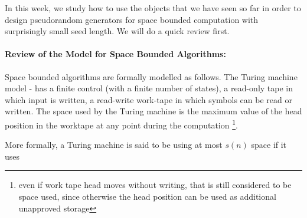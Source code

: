 
In this week, we study how to use the objects that we have seen so far in order to design pseudorandom generators for space bounded computation with surprisingly small seed length. We will do a quick review first.

\paragraph{Review of the Model for Space Bounded Algorithms:} Space bounded algorithms are formally modelled as follows. The Turing machine model - has a finite control (with a finite number of states), a read-only tape in which input is written, a read-write work-tape in which symbols can be read or written. The space used by the Turing machine is the maximum value of the head position in the worktape at any point during the computation \footnote{even if work tape head moves without writing, that is still considered to be space used, since otherwise the head position can be used as additional unapproved storage}.

More formally, a Turing machine is said to be using at most $s(n)$ space if it uses 